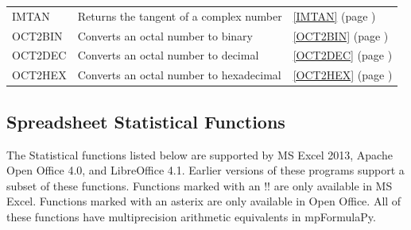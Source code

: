 \begin{center}
\begin{longtable}{l l l }
		IMTAN & Returns the tangent of a complex number &  \ref{IMTAN} (page \pageref{IMTAN}) \index{Spreadsheet Functions!IMTAN} \\
		
		OCT2BIN & Converts an octal number to binary &  \ref{OCT2BIN} (page \pageref{OCT2BIN}) \index{Spreadsheet Functions!OCT2BIN} \\
		OCT2DEC & Converts an octal number to decimal &  \ref{OCT2DEC} (page \pageref{OCT2DEC}) \index{Spreadsheet Functions!OCT2DEC} \\
		OCT2HEX & Converts an octal number to hexadecimal &  \ref{OCT2HEX} (page \pageref{OCT2HEX}) \index{Spreadsheet Functions!OCT2HEX} \\				
	\end{longtable}
\end{center}





\newpage 
\subsection{Spreadsheet Statistical Functions}
The Statistical functions listed below are supported by MS Excel 2013, Apache Open Office 4.0, and LibreOffice 4.1. Earlier versions of these programs support a subset of these functions.  
Functions marked with an !! are only available in MS Excel. Functions marked with an asterix are only available in Open Office.
All of these functions have multiprecision arithmetic equivalents in mpFormulaPy.





